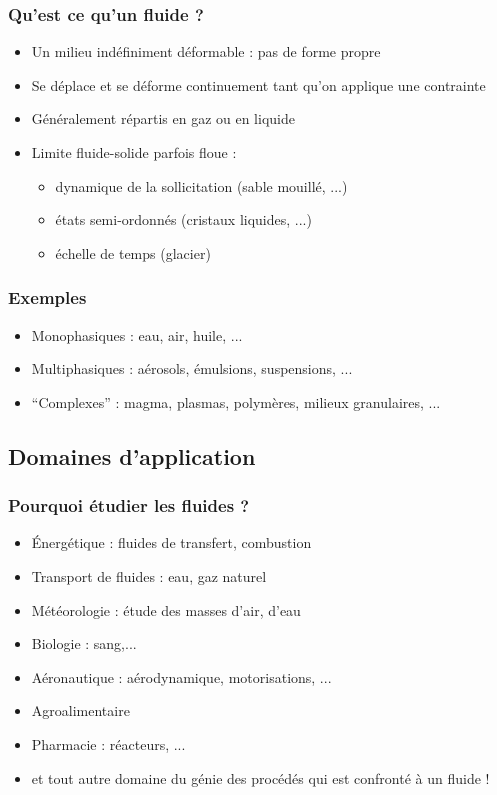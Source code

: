\documentclass[%
	final, %
	 10pt, %
 	compress, %
hyperref={bookmarks=true}	
]{beamer}
\begin{document}
\begin{frame}\frametitle{Qu'est ce qu'un fluide ?}
\begin{itemize}
\item Un milieu indéfiniment déformable : pas de forme propre
\item Se déplace et se déforme continuement tant qu'on applique une
  contrainte
\item Généralement répartis en gaz ou en liquide
\item Limite fluide-solide parfois floue :
\begin{itemize}
\item dynamique de la sollicitation (sable mouillé, ...)
\item états semi-ordonnés (cristaux liquides, ...)
\item échelle de temps (glacier)
\end{itemize}
\end{itemize}
\end{frame}

\begin{frame}\frametitle{Exemples}
\begin{itemize}
\item Monophasiques : eau, air, huile, ...
\item Multiphasiques : aérosols, émulsions, suspensions, ...
\item \enquote{Complexes} : magma, plasmas, polymères, milieux
  granulaires, ...
\end{itemize}
\end{frame}



\subsection{Domaines d'application}
\label{sec:doma-dappl}

\begin{frame}\frametitle{Pourquoi étudier les fluides ?}
\begin{itemize}
\item \'{E}{}nergétique : fluides de transfert, combustion
\item Transport de fluides : eau, gaz naturel
\item Météorologie : étude des masses d'air, d'eau
\item Biologie : sang,...
\item Aéronautique : aérodynamique, motorisations, ...
\item Agroalimentaire
\item Pharmacie : réacteurs, ...
\item et tout autre domaine du génie des procédés qui est confronté à un fluide !
\end{itemize}
\end{frame}
\end{document}
